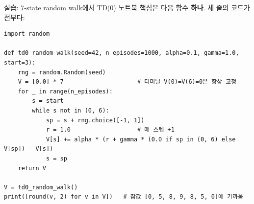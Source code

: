 \documentclass[aspectratio=169,11pt]{beamer}
\begin{document}
\begin{frame}[fragile]{실습: 7-state random walk에서 TD(0)}
  노트북 핵심은 다음 함수 \textbf{하나}. 세 줄의 코드가 전부다:
\begin{lstlisting}
import random

def td0_random_walk(seed=42, n_episodes=1000, alpha=0.1, gamma=1.0, start=3):
    rng = random.Random(seed)
    V = [0.0] * 7                     # 터미널 V(0)=V(6)=0은 항상 고정
    for _ in range(n_episodes):
        s = start
        while s not in (0, 6):
            sp = s + rng.choice([-1, 1])
            r = 1.0                   # 매 스텝 +1
            V[s] += alpha * (r + gamma * (0.0 if sp in (0, 6) else V[sp]) - V[s])
            s = sp
    return V

V = td0_random_walk()
print([round(v, 2) for v in V])   # 참값 [0, 5, 8, 9, 8, 5, 0]에 가까움
\end{lstlisting}
\end{frame}

\end{document}
